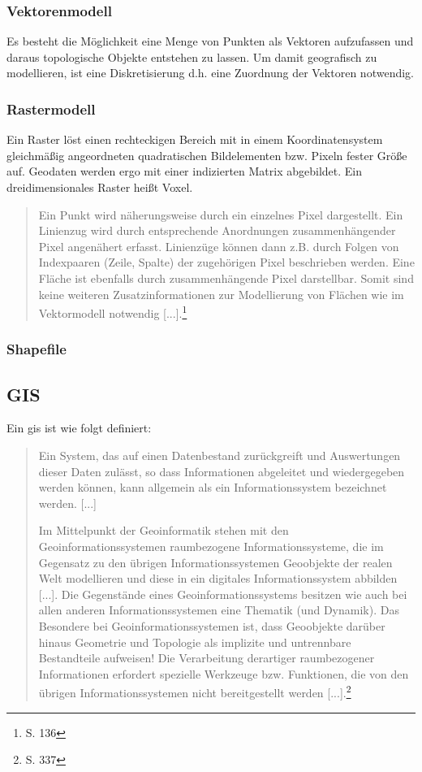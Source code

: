 \subsubsection{Vektorenmodell}

Es besteht die Möglichkeit eine Menge von Punkten als Vektoren aufzufassen und daraus topologische Objekte entstehen zu lassen.
Um damit geografisch zu modellieren, ist eine Diskretisierung d.h. eine Zuordnung der Vektoren notwendig. 

\subsubsection{Rastermodell}

Ein Raster löst einen rechteckigen Bereich mit in einem Koordinatensystem gleichmäßig angeordneten quadratischen Bildelementen bzw. Pixeln fester Größe auf.
Geodaten werden ergo mit einer indizierten Matrix abgebildet.
Ein dreidimensionales Raster heißt Voxel.
\begin{quote}
Ein Punkt wird näherungsweise durch ein einzelnes Pixel dargestellt. Ein Linienzug wird durch entsprechende Anordnungen zusammenhängender Pixel angenähert erfasst. Linienzüge können dann z.B. durch Folgen von Indexpaaren (Zeile, Spalte) der zugehörigen Pixel beschrieben werden. Eine Fläche ist ebenfalls durch zusammenhängende Pixel darstellbar. Somit sind keine weiteren Zusatzinformationen zur Modellierung von Flächen wie im Vektormodell notwendig [...].\footnote{\cite{book:gi-theopluspraxis3} S. 136}
\end{quote}


\subsubsection{Shapefile}

\subsection{GIS}
\label{grundlagen:gis}

Ein \Gls{gis} ist wie folgt definiert:
\begin{quote}
Ein System,  das  auf einen Datenbestand zurückgreift und Auswertungen dieser Daten zulässt,  so dass Informationen abgeleitet und wiedergegeben werden können,  kann  allgemein  als  ein  Informationssystem  bezeichnet  werden. [...]

Im Mittelpunkt  der  Geoinformatik  stehen  mit den  Geoinformationssystemen raumbezogene Informationssysteme, die im Gegensatz zu den übrigen Informationssystemen Geoobjekte  der realen Welt modellieren und diese in ein digitales Informationssystem abbilden [...]. Die Gegenstände eines Geoinformationssystems  besitzen  wie  auch  bei  allen  anderen  Informationssystemen  eine 
Thematik (und Dynamik). Das Besondere bei Geoinformationssystemen ist, dass Geoobjekte darüber hinaus Geometrie und Topologie als implizite und untrennbare Bestandteile aufweisen!  Die Verarbeitung derartiger raumbezogener Informationen erfordert spezielle Werkzeuge bzw. Funktionen, die von den übrigen Informationssystemen nicht bereitgestellt werden [...].\footnote{\cite{book:gi-theopluspraxis3} S. 337}
\end{quote}

